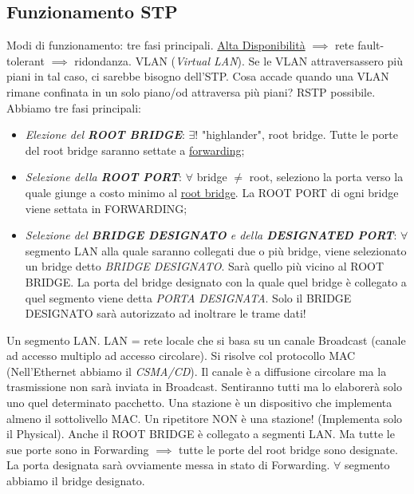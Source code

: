 \subsection{Funzionamento STP}

Modi di funzionamento: tre fasi principali. \underline{Alta Disponibilità} $\implies$ rete fault-tolerant $\implies$ ridondanza. VLAN (\textit{Virtual LAN}). Se le VLAN attraversassero più piani in tal caso, ci sarebbe bisogno dell'STP. Cosa accade quando una VLAN rimane confinata in un solo piano/od attraversa più piani? RSTP possibile. Abbiamo tre fasi principali:

\begin{itemize}

\item{\textit{Elezione del \textbf{ROOT BRIDGE}}}: $\exists!$ "highlander", root bridge. Tutte le porte del root bridge saranno settate a \underline{forwarding};
\item{\textit{Selezione della \textbf{ROOT PORT}}}: $\forall$ bridge $\neq$ root, seleziono la porta verso la quale giunge a costo minimo al \underline{root bridge}. La ROOT PORT di ogni bridge viene settata in FORWARDING;
\item{\textit{Selezione del \textbf{BRIDGE DESIGNATO} e della \textbf{DESIGNATED PORT}}}: $\forall$ segmento LAN alla quale saranno collegati due o più bridge, viene selezionato un bridge detto \textit{BRIDGE DESIGNATO}. Sarà quello più vicino al ROOT BRIDGE. La porta del bridge designato con la quale quel bridge è collegato a quel segmento viene detta \textit{PORTA DESIGNATA}. Solo il BRIDGE DESIGNATO sarà autorizzato ad inoltrare le trame dati!

\end{itemize}

 Un segmento LAN. LAN = rete locale che si basa su un canale Broadcast (canale ad accesso multiplo ad accesso circolare). Si risolve col protocollo MAC (Nell'Ethernet abbiamo il \textit{CSMA/CD}). Il canale è a diffusione circolare ma la trasmissione non sarà inviata in Broadcast. Sentiranno tutti ma lo elaborerà solo uno quel determinato pacchetto. Una stazione è un dispositivo che implementa almeno il sottolivello MAC. Un ripetitore NON è una stazione! (Implementa solo il Physical). Anche il ROOT BRIDGE è collegato a segmenti LAN. Ma tutte le sue porte sono in Forwarding $\implies$ tutte le porte del root bridge sono designate. La porta designata sarà ovviamente messa in stato di Forwarding. $\forall$ segmento abbiamo il bridge designato. 


